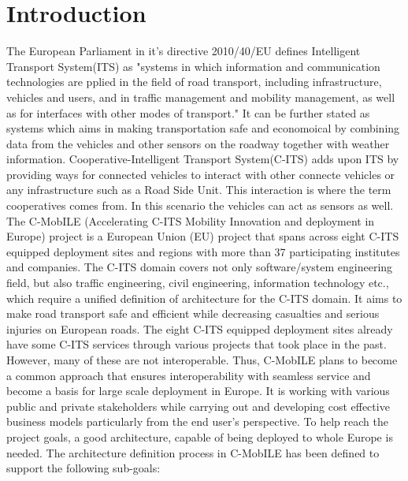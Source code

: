 \documentclass[conference]{IEEEtran}
\begin{document}
	\section{Introduction}
	The European Parliament in it's directive 2010/40/EU \cite{ec} defines Intelligent Transport System(ITS) as "systems in which information and communication technologies are pplied in the field of road transport, including infrastructure, vehicles and users, and in traffic management and mobility management, as well as for interfaces with other modes of transport." It can be further stated as systems which aims in making transportation safe and economoical by combining data from the vehicles and other sensors on the roadway together with weather information. Cooperative-Intelligent Transport System(C-ITS) \cite{c-its} adds upon ITS by providing ways for connected vehicles to interact with other connecte vehicles or any infrastructure such as a Road Side Unit. This interaction is where the term cooperatives comes from. In this scenario the vehicles can act as sensors as well. 
	The C-MobILE (Accelerating C-ITS Mobility Innovation and deployment in Europe) project is a European Union (EU) project that spans across eight C-ITS equipped deployment sites and regions with more than 37 participating institutes and companies. The C-ITS domain covers not only software/system engineering field, but also traffic engineering, civil engineering, information technology etc., which require a unified definition of architecture for the C-ITS domain. It aims to make road transport safe and efficient while decreasing casualties and serious injuries on European roads. The eight C-ITS equipped deployment sites already have some C-ITS services through various projects that took place in the past. However, many of these are not interoperable. Thus, C-MobILE plans to become a common approach that ensures interoperability with seamless service and become a basis for large scale deployment in Europe. It is working with various public and private stakeholders while carrying out and developing cost effective business models particularly from the end user’s perspective. To help reach the project goals, a good architecture, capable of being deployed to whole Europe is needed. The architecture definition process in C-MobILE has been defined to support the following sub-goals:
	
\end{document}

